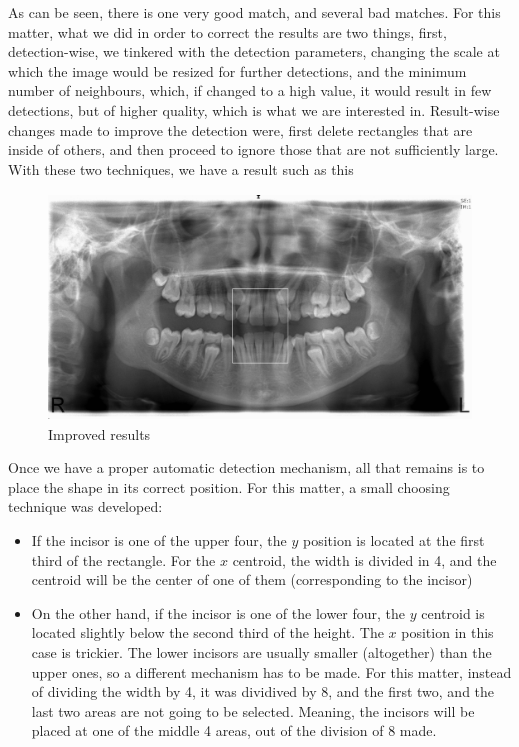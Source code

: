 As can be seen, there is one very good match, and several bad matches. For this
matter, what we did in order to correct the results are two things, 
first, detection-wise, we tinkered with the detection parameters, changing the
scale at which the image would be resized for further detections, and the
minimum number of neighbours, which, if changed to a high value, it would result
in few detections, but of higher quality, which is what we are interested in.
Result-wise changes made to improve the detection were, first delete rectangles
that are inside of others, and then proceed to ignore those that are not
sufficiently large. With these two techniques, we have a result such as
this

\begin{figure}[h]
  \centering
  \includegraphics[height=6cm]{img/teeth_detection_2}
  \caption{Improved results}
\end{figure}

Once we have a proper automatic detection mechanism, all that remains is to place
the shape in its correct position. For this matter, a small choosing technique
was developed:
\begin{itemize}
  \item If the incisor is one of the upper four, the $y$ position is located at
the first third of the rectangle. For the $x$ centroid, the width is divided in 4,
and the centroid will be the center of one of them (corresponding to the
incisor)
  \item On the other hand, if the incisor is one of the lower four, the $y$
centroid is located slightly below the second third of the height. The $x$
position in this case is trickier. The lower incisors are usually smaller
(altogether) than the upper ones, so a different mechanism has to be made. For
this matter, instead of dividing the width by 4, it was dividived by 8, and the
first two, and the last two areas are not going to be selected. Meaning, the
incisors will be placed at one of the middle 4 areas, out of the division of 8
made.  
\end{itemize}
